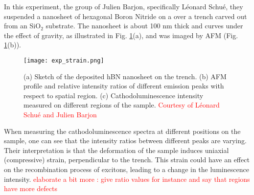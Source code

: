 In this experiment, the group of Julien Barjon, specifically Léonard Schué, they suspended a nanosheet of hexagonal Boron Nitride on a over a trench carved out from an SiO$_2$ substrate. The nanosheet is about 100 nm thick and curves under the effect of gravity, as illustrated in Fig. \ref{fig:exp_strain}(a), and was imaged by \acrfull{AFM} (Fig. \ref{fig:exp_strain}(b)).
\begin{figure}[h!tbp]
	\vspace{0.5cm}
	\setcapindent{2em}
	\centering
	\texttt{[image: exp\_strain.png]}
	\caption{(a) Sketch of the deposited hBN nanosheet on the trench. (b) AFM profile and relative intensity ratios of different emission peaks with respect to spatial region. (c) Cathodoluminescence intensity measured on different regions of the sample. \textcolor{red}{Courtesy of Léonard Schué and Julien Barjon}}
	\label{fig:exp_strain}
\end{figure}
When measuring the cathodoluminescence spectra at different positions on the sample, one can see that the intensity ratios between different peaks are varying. Their interpretation is that the deformation of the sample induces uniaxial (compressive) strain, perpendicular to the trench. This strain could have an effect on the recombination process of excitons, leading to a change in the luminescence intensity. \textcolor{red}{elaborate a bit more : give ratio values for instance and say that regions have more defects}
%
%
